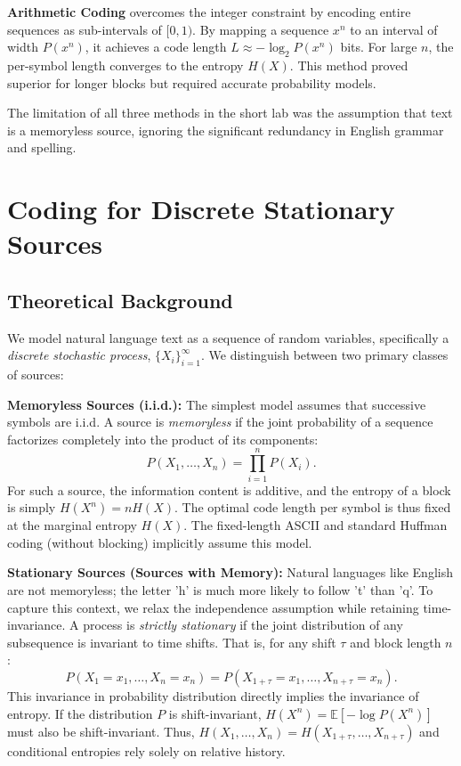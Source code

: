 \documentclass[11pt,a4paper]{article}
\theoremstyle{definition} %
\newcommand{\E}{\mathbb{E}}
\begin{document}
\textbf{Arithmetic Coding} overcomes the integer constraint by encoding entire sequences as sub-intervals of $[0, 1)$. By mapping a sequence $x^n$ to an interval of width $P(x^n)$, it achieves a code length $L \approx -\log_2 P(x^n)$ bits. For large $n$, the per-symbol length converges to the entropy $H(X)$. This method proved superior for longer blocks but required accurate probability models.

The limitation of all three methods in the short lab was the assumption that text is a memoryless source, ignoring the significant redundancy in English grammar and spelling.

\newpage

\section{Coding for Discrete Stationary Sources}

\subsection{Theoretical Background}

We model natural language text as a sequence of random variables, specifically a \textit{discrete stochastic process}, $\{X_i\}_{i=1}^\infty$. We distinguish between two primary classes of sources:

\textbf{Memoryless Sources (i.i.d.):}
The simplest model assumes that successive symbols are i.i.d. A source is \textit{memoryless} if the joint probability of a sequence factorizes completely into the product of its components:
\begin{equation}
    P(X_1, \dots, X_n) = \prod_{i=1}^n P(X_i).
\end{equation}
For such a source, the information content is additive, and the entropy of a block is simply $H(X^n) = n H(X)$. The optimal code length per symbol is thus fixed at the marginal entropy $H(X)$. The fixed-length ASCII and standard Huffman coding (without blocking) implicitly assume this model.

\textbf{Stationary Sources (Sources with Memory):}
Natural languages like English are not memoryless; the letter 'h' is much more likely to follow 't' than 'q'. To capture this context, we relax the independence assumption while retaining time-invariance. A process is \textit{strictly stationary} if the joint distribution of any subsequence is invariant to time shifts. That is, for any shift $\tau$ and block length $n$:
\begin{equation}
    P(X_1 = x_1, \dots, X_n = x_n) = P(X_{1+\tau} = x_1, \dots, X_{n+\tau} = x_n).
\end{equation}
This invariance in probability distribution directly implies the invariance of entropy. If the distribution $P$ is shift-invariant, $H(X^n) = \E[-\log P(X^n)]$ must also be shift-invariant. Thus, $H(X_1, \dots, X_n) = H(X_{1+\tau}, \dots, X_{n+\tau})$ and conditional entropies rely solely on relative history.
\end{document}
